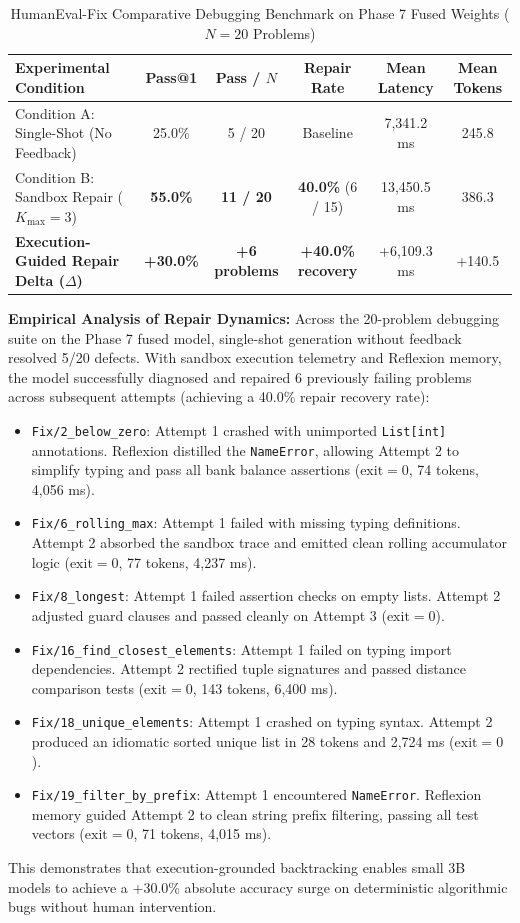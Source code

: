\documentclass[10pt,a4paper]{article}
\begin{document}
\begin{table}[h!]
\centering
\caption{HumanEval-Fix Comparative Debugging Benchmark on Phase 7 Fused Weights ($N=20$ Problems)}
\label{tab:humaneval_fix}
\footnotesize
\setlength{\tabcolsep}{4pt}
\begin{tabular}{@{}lccccc@{}}
\toprule
\textbf{Experimental Condition} & \textbf{Pass@1} & \textbf{Pass / $N$} & \textbf{Repair Rate} & \textbf{Mean Latency} & \textbf{Mean Tokens} \\ \midrule
Condition A: Single-Shot (No Feedback) & 25.0\% & 5 / 20 & Baseline & 7,341.2 ms & 245.8 \\
Condition B: Sandbox Repair ($K_{\max}=3$) & \textbf{55.0\%} & \textbf{11 / 20} & \textbf{40.0\%} (6 / 15) & 13,450.5 ms & 386.3 \\ \midrule
\textbf{Execution-Guided Repair Delta ($\Delta$)} & \textbf{+30.0\%} & \textbf{+6 problems} & \textbf{+40.0\% recovery} & +6,109.3 ms & +140.5 \\ \bottomrule
\end{tabular}
\end{table}

\textbf{Empirical Analysis of Repair Dynamics:} Across the 20-problem debugging suite on the Phase 7 fused model, single-shot generation without feedback resolved 5/20 defects. With sandbox execution telemetry and Reflexion memory, the model successfully diagnosed and repaired 6 previously failing problems across subsequent attempts (achieving a 40.0\% repair recovery rate):
\begin{itemize}
    \item \texttt{Fix/2\_below\_zero}: Attempt 1 crashed with unimported \texttt{List[int]} annotations. Reflexion distilled the \texttt{NameError}, allowing Attempt 2 to simplify typing and pass all bank balance assertions ($\text{exit}=0$, 74 tokens, 4,056 ms).
    \item \texttt{Fix/6\_rolling\_max}: Attempt 1 failed with missing typing definitions. Attempt 2 absorbed the sandbox trace and emitted clean rolling accumulator logic ($\text{exit}=0$, 77 tokens, 4,237 ms).
    \item \texttt{Fix/8\_longest}: Attempt 1 failed assertion checks on empty lists. Attempt 2 adjusted guard clauses and passed cleanly on Attempt 3 ($\text{exit}=0$).
    \item \texttt{Fix/16\_find\_closest\_elements}: Attempt 1 failed on typing import dependencies. Attempt 2 rectified tuple signatures and passed distance comparison tests ($\text{exit}=0$, 143 tokens, 6,400 ms).
    \item \texttt{Fix/18\_unique\_elements}: Attempt 1 crashed on typing syntax. Attempt 2 produced an idiomatic sorted unique list in 28 tokens and 2,724 ms ($\text{exit}=0$).
    \item \texttt{Fix/19\_filter\_by\_prefix}: Attempt 1 encountered \texttt{NameError}. Reflexion memory guided Attempt 2 to clean string prefix filtering, passing all test vectors ($\text{exit}=0$, 71 tokens, 4,015 ms).
\end{itemize}
This demonstrates that execution-grounded backtracking enables small 3B models to achieve a +30.0\% absolute accuracy surge on deterministic algorithmic bugs without human intervention.
\end{document}
